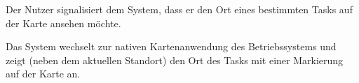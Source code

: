 	\begin{description}
		\begin{verlauf}
		
			\item Der Nutzer signalisiert dem System, dass er den Ort eines bestimmten Tasks auf der Karte ansehen möchte.
			\item Das System wechselt zur nativen Kartenanwendung des Betriebssystems und zeigt (neben dem aktuellen Standort) den Ort des Tasks mit einer Markierung auf der Karte an.
		
		\end{verlauf}
	\end{description}
	